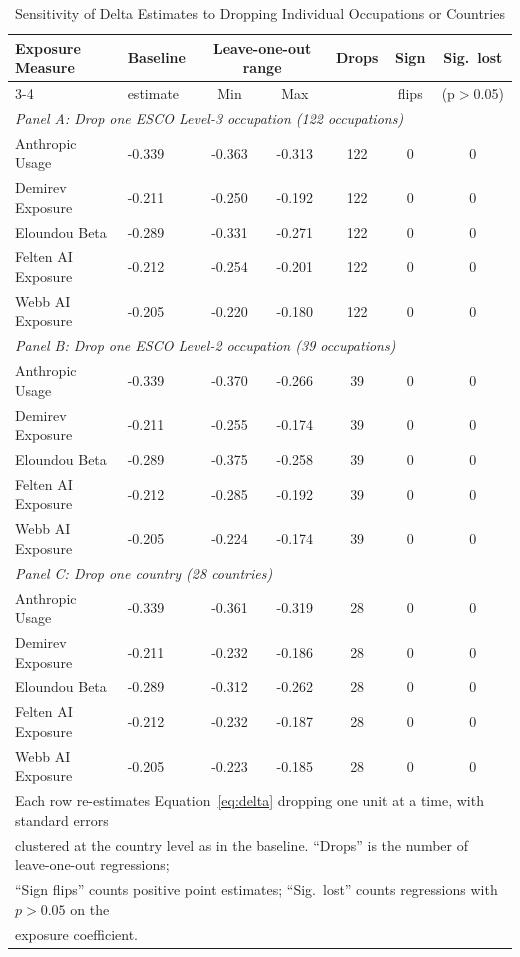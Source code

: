 \documentclass[11pt]{article}
\begin{document}
\begin{table}[H]
\centering
\caption{Sensitivity of Delta Estimates to Dropping Individual Occupations or Countries}
\begin{tabular}{llccccc}
\hline\hline
Exposure Measure & Baseline & \multicolumn{2}{c}{Leave-one-out range} & Drops & Sign & Sig.\ lost \\
\cmidrule{3-4}
 & estimate & Min & Max & & flips & (p$>$0.05) \\
\midrule
\multicolumn{7}{l}{\textit{Panel A: Drop one ESCO Level-3 occupation (122 occupations)}} \\
\midrule
Anthropic Usage & -0.339 & -0.363 & -0.313 & 122 & 0 & 0 \\
Demirev Exposure & -0.211 & -0.250 & -0.192 & 122 & 0 & 0 \\
Eloundou Beta & -0.289 & -0.331 & -0.271 & 122 & 0 & 0 \\
Felten AI Exposure & -0.212 & -0.254 & -0.201 & 122 & 0 & 0 \\
Webb AI Exposure & -0.205 & -0.220 & -0.180 & 122 & 0 & 0 \\
\midrule
\multicolumn{7}{l}{\textit{Panel B: Drop one ESCO Level-2 occupation (39 occupations)}} \\
\midrule
Anthropic Usage & -0.339 & -0.370 & -0.266 & 39 & 0 & 0 \\
Demirev Exposure & -0.211 & -0.255 & -0.174 & 39 & 0 & 0 \\
Eloundou Beta & -0.289 & -0.375 & -0.258 & 39 & 0 & 0 \\
Felten AI Exposure & -0.212 & -0.285 & -0.192 & 39 & 0 & 0 \\
Webb AI Exposure & -0.205 & -0.224 & -0.174 & 39 & 0 & 0 \\
\midrule
\multicolumn{7}{l}{\textit{Panel C: Drop one country (28 countries)}} \\
\midrule
Anthropic Usage & -0.339 & -0.361 & -0.319 & 28 & 0 & 0 \\
Demirev Exposure & -0.211 & -0.232 & -0.186 & 28 & 0 & 0 \\
Eloundou Beta & -0.289 & -0.312 & -0.262 & 28 & 0 & 0 \\
Felten AI Exposure & -0.212 & -0.232 & -0.187 & 28 & 0 & 0 \\
Webb AI Exposure & -0.205 & -0.223 & -0.185 & 28 & 0 & 0 \\
\hline\hline
\multicolumn{7}{l}{\footnotesize Each row re-estimates Equation~\ref{eq:delta} dropping one unit at a time, with standard errors} \\
\multicolumn{7}{l}{\footnotesize clustered at the country level as in the baseline. ``Drops'' is the number of leave-one-out regressions;} \\
\multicolumn{7}{l}{\footnotesize ``Sign flips'' counts positive point estimates; ``Sig.\ lost'' counts regressions with $p>0.05$ on the} \\
\multicolumn{7}{l}{\footnotesize exposure coefficient.} \\
\end{tabular}
\label{table:sensitivity}
\end{table}
\end{document}
